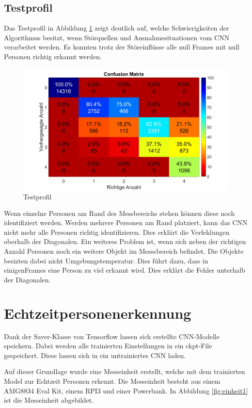 \subsection{Testprofil}
\label{subsec:Testprofil}
Das Testprofil in Abbildung \ref{fig:profil4} zeigt deutlich auf, welche Schwierigkeiten der Algorithmus besitzt, wenn Störquellen und Ausnahmesituationen vom \ac{CNN} verarbeitet werden. Es konnten trotz der Störeinflüsse alle null Frames mit null Personen richtig erkannt werden. 
 
\begin{figure}[H]
	\centering
	\includegraphics[width=0.55\linewidth]{fig/Testprofilm}
	\caption{Testprofil}
	\label{fig:profil4}
\end{figure}

Wenn einzelne Personen am Rand des Messbereichs stehen können diese noch identifiziert werden. Werden mehrere Personen am Rand platziert, kann das \ac{CNN} nicht mehr alle Personen richtig identifizieren. Dies erklärt die Verfehlungen oberhalb der Diagonalen.
Ein weiteres Problem ist, wenn sich neben der richtigen Anzahl Personen noch ein weitere Objekt im Messsbereich befindet. Die Objekte besizten dabei nicht Umgebungstemperatur. Dies führt dazu, dass in einigenFrames eine Person zu viel erkannt wird. Dies erklärt die Fehler unterhalb der Diagonalen. 

\newpage

\section{Echtzeitpersonenerkennung}
\label{sec:Echtzeitpersonenerkennung}
Dank der Saver-Klasse von Tensorflow lassen sich erstellte \ac{CNN}-Modelle speichern. Dabei werden alle trainierten Einstellungen in ein ckpt-File gespeichert. Diese lassen sich in ein untrainiertes \ac{CNN} laden.

Auf dieser Grundlage wurde eine Messeinheit erstellt, welche mit dem trainierten Model zur Echtzeit Personen erkennt. Die Messeinheit besteht aus einem AMG8834 Eval Kit, einem \ac{RPI3} und einer Powerbank. 
In Abbildung \ref{fig:einheit1} ist die Messeinheit abgebildet. 


